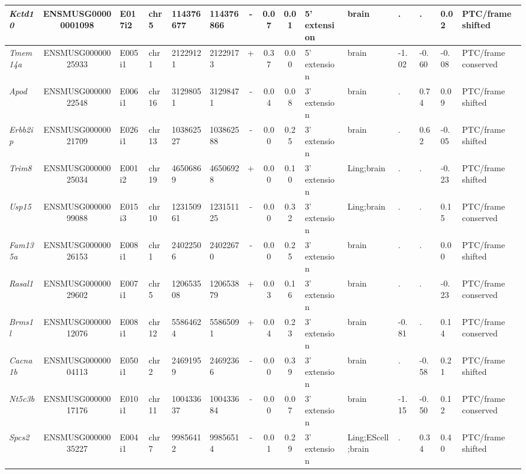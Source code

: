 \begin{landscape}
\begin{table}[htbp]
{\begin{tabular}{|l|c|l|l|l|l|c|c|c|l|l|l|l|l|l|}
		\textit{Kctd10} & ENSMUSG00000001098 & E017i2 & chr5  & 114376677 & 114376866 & -     & 0.07  & 0.01  & 5' extension & brain & .     & .     & 0.02  & PTC/frame shifted \\ \hline
		\textit{Tmem14a} & ENSMUSG00000025933 & E005i1 & chr1  & 21229121 & 21229173 & +     & 0.37  & 0.00  & 5' extension & brain & -1.02 & -0.60 & -0.08 & PTC/frame conserved \\ \hline
		\textit{Apod} & ENSMUSG00000022548 & E006i1 & chr16 & 31298051 & 31298471 & -     & 0.04  & 0.08  & 3' extension & brain & .     & 0.74  & 0.09  & PTC/frame shifted \\ \hline
		\textit{Erbb2ip} & ENSMUSG00000021709 & E026i1 & chr13 & 103862527 & 103862588 & -     & 0.00  & 0.25  & 3' extension & brain & .     & 0.62  & -0.05 & PTC/frame shifted \\ \hline
		\textit{Trim8} & ENSMUSG00000025034 & E001i2 & chr19 & 46506869 & 46506928 & +     & 0.00  & 0.10  & 3' extension & Ling;brain & .     & .     & -0.23 & PTC/frame shifted \\ \hline
		\textit{Usp15} & ENSMUSG00000099088 & E015i3 & chr10 & 123150961 & 123151125 & -     & 0.00  & 0.32  & 3' extension & Ling;brain & .     & .     & 0.15  & PTC/frame conserved \\ \hline
		\textit{Fam135a} & ENSMUSG00000026153 & E008i1 & chr1  & 24022506 & 24022670 & -     & 0.00  & 0.25  & 3' extension & brain & .     & .     & 0.00  & PTC/frame shifted \\ \hline
		\textit{Rasal1} & ENSMUSG00000029602 & E007i1 & chr5  & 120653508 & 120653879 & +     & 0.03  & 0.16  & 3' extension & brain & .     & .     & -0.23 & PTC/frame conserved \\ \hline
		\textit{Brms1l} & ENSMUSG00000012076 & E008i1 & chr12 & 55864624 & 55865091 & +     & 0.04  & 0.23  & 3' extension & brain & -0.81 & .     & 0.14  & PTC/frame conserved \\ \hline
		\textit{Cacna1b} & ENSMUSG00000004113 & E050i1 & chr2  & 24691959 & 24692366 & -     & 0.00  & 0.39  & 3' extension & brain & .     & -0.58 & 0.21  & PTC/frame shifted \\ \hline
		\textit{Nt5c3b} & ENSMUSG00000017176 & E010i1 & chr11 & 100433637 & 100433684 & -     & 0.00  & 0.07  & 3' extension & brain & -1.15 & -0.50 & 0.12  & PTC/frame conserved \\ \hline
		\textit{Spcs2} & ENSMUSG00000035227 & E004i1 & chr7  & 99856412 & 99856514 & -     & 0.01  & 0.29  & 3' extension & Ling;EScell;brain & .     & 0.34  & 0.40  & PTC/frame shifted \\ \hline

\end{tabular}}
\end{table}
\end{landscape}
